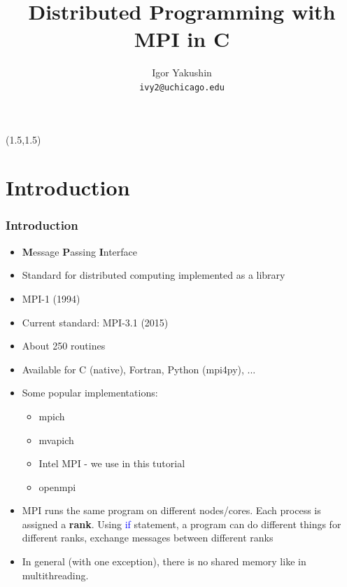\documentclass{beamer}
\title{\huge{Distributed Programming with MPI in C}}
\author{Igor Yakushin \\ \texttt{ivy2@uchicago.edu}}
\newcommand{\RCCLogo}{
\begin{textblock}{14}(1.5,1.5)
  \pgfuseimage{logo_rcc}
\end{textblock}
}
\begin{document}



\begin{frame}
\RCCLogo
\titlepage
\end{frame}

\section{Introduction}
\begin{frame}[fragile]
  \frametitle{Introduction}

\begin{itemize}
\item {\color{mycolordef}\textbf{M}}essage {\color{mycolordef}\textbf{P}}assing {\color{mycolordef}\textbf{I}}nterface
\item Standard for distributed computing implemented as a library
\item MPI-1 (1994)
\item Current standard: MPI-3.1 (2015)
\item About 250 routines
\item Available for C (native), Fortran, Python (mpi4py), ...
\item Some popular implementations:
  \begin{itemize}
    \item mpich
    \item mvapich
    \item Intel MPI - we use in this tutorial
    \item openmpi
  \end{itemize}
\item MPI runs the same program on different nodes/cores. Each process is assigned a  {\color{mycolordef}\textbf{rank}}. 
  Using \textcolor{blue}{if} statement, a program can do different things for different ranks, exchange messages between different ranks
\item In general (with one exception), there is no shared memory like in multithreading.
\end{itemize}

\end{frame}
\end{document}
